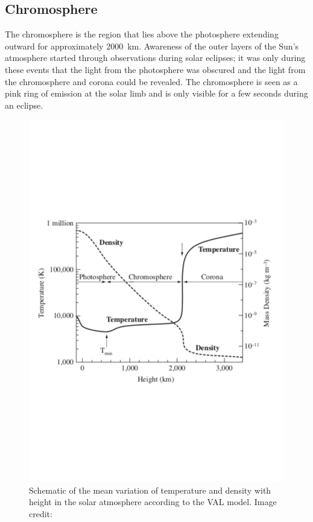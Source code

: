 \subsection{Chromosphere}
\label{Chp1_atmosphere_chromosphere}
The chromosphere is the region that lies above the photosphere extending outward for approximately 2000~km. Awareness of the outer layers of the Sun's atmosphere started through observations during solar eclipses; it was only during these events that the light from the photosphere was obscured and the light from the chromosphere and corona could be revealed. The chromosphere is seen as a pink ring of emission at the solar limb and is only visible for a few seconds during an eclipse.

\begin{figure}
    \centering
    \includegraphics[scale=0.5]{Figures/1-Introduction/val_model_MHD_of_Sun_textbook.pdf}
    \caption[VAL model that shows the mean variation of temperature and density with height in the solar atmosphere]{Schematic of the mean variation of temperature and density with height in the solar atmosphere according to the VAL model. Image credit: \citet{Priest_2014_MHD_sun}}
    \label{fig:val_model}
\end{figure}

